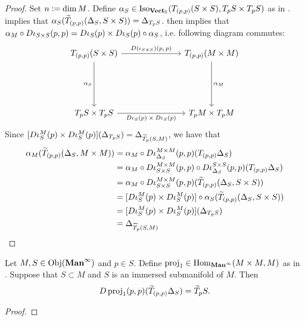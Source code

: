 \documentclass{book}
\begin{document}
\begin{proof}
	Set $n \vcentcolon= \dim M$. Define $\alpha_S \in \operatorname{Iso}_{\operatorname*{\text{\textbf{Vect}}_{\mathbb{R}}}}(T_{(p,p)}(S \times S), T_pS \times  T_pS)$ as in .  implies that $\alpha_S(\widetilde{T}_{(p,p)} (\Delta_S, S \times S)) = \Delta_{T_p S}$.  then implies that $\alpha_M \circ D\iota_{S \times S}(p,p) = {D \iota_S(p) \times D \iota_S (p)} \circ \alpha_S$,
	i.e. following diagram commutes: 
	\[ 
	\begin{tikzcd}
		\text{$T_{(p, p)}(S \times S)$} \arrow[ddd, "\al_S"'] \arrow[rrr, "\text{$D(\iota_{S \times S})(p,p)$}"] &&&  \text{$T_{(p,p)}(M \times M)$} \arrow[ddd, "\al_M"] \\
		& \\
		& \\
		\text{$T_pS \times T_pS$} \arrow[rrr, "\text{$D\iota_S(p) \times D\iota_S(p)$}"'] &&&  \text{$T_p M \times T_p M$}
	\end{tikzcd}
	\]
	Since $[D \iota_S^M(p) \times D \iota_S^M (p)] (\Delta_{T_p S}) = \Delta_{\widetilde{T}_p (S, M)}$, we have that
	\begin{align*}
		\alpha_M (\widetilde{T}_{(p,p)} (\Delta_S, M \times M)) 
		& = \alpha_M \circ D \iota_{\Delta_S}^{M \times M}(p,p) (T_{(p,p)} \Delta_S) \\
		& = \alpha_M \circ D \iota_{S \times S}^{M \times M}(p,p) \circ D \iota_{\Delta_S}^{S \times S}(p,p) (T_{(p,p)} \Delta_S) \\
		& = \alpha_M \circ D \iota_{S \times S}^{M \times M}(p,p) (\widetilde{T}_{(p,p)} (\Delta_S, S \times S)) \\
		& = [D \iota_S^M(p) \times D \iota_S^M (p)] \circ \alpha_S(\widetilde{T}_{(p,p)} (\Delta_S, S \times S)) \\ 
		& = [D \iota_S^M(p) \times D \iota_S^M (p)] (\Delta_{T_p S}) \\ 
		& = \Delta_{\widetilde{T}_p (S, M)} 
	\end{align*}
\end{proof}

\begin{ex} 
	Let $M, S \in \operatorname{Obj}(\operatorname*{\text{\textbf{Man}}^{\infty}})$ and $p \in S$. Define $\operatorname{\text{proj}}_1 \in \operatorname{Hom}_{\operatorname*{\text{\textbf{Man}}^{\infty}}}(M \times M, M)$ as in  . Suppose that $S \subset M$ and $S$ is an immersed submanifold of $M$. Then 
	$$D \operatorname{\text{proj}}_1(p,p) (\widetilde{T}_{(p,p)} \Delta_{S}) = \widetilde{T}_p S.$$
\end{ex}

\begin{proof}
	  
\end{proof}
\end{document}

